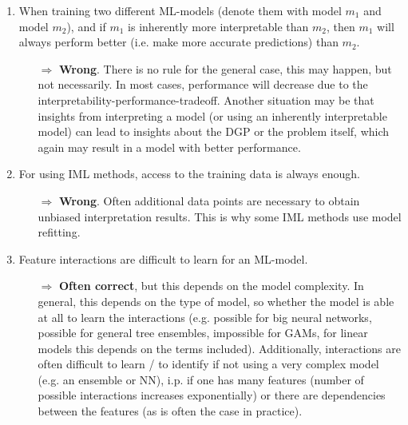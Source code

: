 \begin{enumerate}
    	\item When training two different ML-models (denote them with model \(m_1\) and model $m_2$), and if $m_1$ is inherently more interpretable than \(m_2\), then $m_1$ will always perform better (i.e. make more accurate predictions) than $m_2$.
    	\begin{itemize}
    		\item[$\Rightarrow$] \textbf{Wrong}. There is no rule for the general case, this may happen, but not necessarily. In most cases, performance will decrease due to the interpretability-performance-tradeoff. Another situation may be that insights from interpreting a model (or using an inherently interpretable model) can lead to insights about the DGP or the problem itself, which again may result in a model with better performance.
    	\end{itemize}

    	\item For using IML methods, access to the training data is always enough.
    	\begin{itemize}
    		\item[$\Rightarrow$] \textbf{Wrong}. Often additional data points are necessary to obtain unbiased interpretation results. This is why some IML methods use model refitting.
    	\end{itemize}

    	\item %
        Feature interactions are difficult to learn for an ML-model.
    	\begin{itemize}
    		\item[$\Rightarrow$] \textbf{Often correct}, but this depends on the model complexity. In general, this depends on the type of model, so whether the model is able at all to learn the interactions (e.g. possible for big neural networks, possible for general tree ensembles, impossible for GAMs, for linear models this depends on the terms included). Additionally, interactions are often difficult to learn / to identify if not using a very complex model (e.g. an ensemble or NN), i.p. if one has many features (number of possible interactions increases exponentially) or there are dependencies between the features (as is often the case in practice).
    	\end{itemize}


\end{enumerate}
